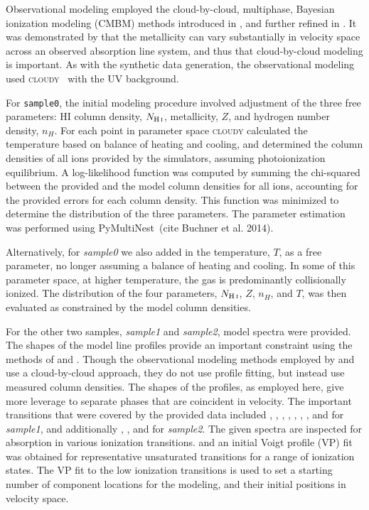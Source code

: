 \documentclass[fleqn,usenatbib]{mnras}
\begin{document}
Observational modeling employed the cloud-by-cloud, multiphase, Bayesian ionization modeling (CMBM) methods introduced in \cite{Sameer2021}, and further refined in \cite{Sameer2022}. It was demonstrated by \cite{Zahedy2019} that the metallicity can vary substantially in velocity space across an observed absorption line system, and thus that cloud-by-cloud modeling is important. As with the synthetic data generation, the observational modeling used \textsc{cloudy}~\citep{Ferland2013} with the \cite{Haardt2012} UV background.

For \texttt{sample0}, the initial modeling procedure involved adjustment of the three free parameters: HI column density, $N_{\ion{H}{I}}$, metallicity, $Z$, and hydrogen number density, $n_H$. For each point in parameter space \textsc{cloudy} calculated the temperature based on balance of heating and cooling, and determined the column densities of all ions provided by the simulators, assuming photoionization equilibrium. A log-likelihood function was computed by summing the chi-squared between the provided and the model column densities for all ions, accounting for the provided errors for each column density.  This function was minimized to determine the distribution of the three parameters. The parameter estimation was performed using PyMultiNest~(cite Buchner et al. 2014). 

Alternatively, for \textit{sample0} we also added in the temperature, $T$, as a free parameter, no longer assuming a balance of heating and cooling.  In some of this parameter space, at higher temperature, the gas is predominantly collisionally ionized.  The distribution of the four parameters, $N_{\ion{H}{I}}$, $Z$, $n_H$, and $T$, was then evaluated as constrained by the model column densities.

For the other two samples, \textit{sample1} and \textit{sample2}, model spectra were provided. The shapes of the model line profiles provide an important constraint using the methods of \cite{Sameer2021} and \cite{Sameer2022}. Though the observational modeling methods employed by \cite{Zahedy2019} and \cite{Haislmaier2021} use a cloud-by-cloud approach, they do not use profile fitting, but instead use measured column densities. The shapes of the profiles, as employed here, give more leverage to separate phases that are coincident in velocity. The important transitions that were covered by the provided  data included , , , , , , , and  for \textit{sample1}, and additionally , , and  for \textit{sample2}. The given spectra are inspected for absorption in various ionization transitions. and an initial Voigt profile (VP) fit was obtained for representative unsaturated transitions for a range of ionization states.  The VP fit to the low ionization transitions is used to set a starting number of component locations for the modeling, and their initial positions in velocity space.
\end{document}
